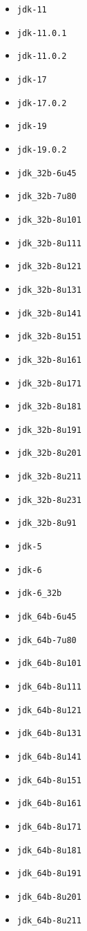 \begin{itemize}
\item \verb|jdk-11|
\item \verb|jdk-11.0.1|
\item \verb|jdk-11.0.2|
\item \verb|jdk-17|
\item \verb|jdk-17.0.2|
\item \verb|jdk-19|
\item \verb|jdk-19.0.2|
\item \verb|jdk_32b-6u45|
\item \verb|jdk_32b-7u80|
\item \verb|jdk_32b-8u101|
\item \verb|jdk_32b-8u111|
\item \verb|jdk_32b-8u121|
\item \verb|jdk_32b-8u131|
\item \verb|jdk_32b-8u141|
\item \verb|jdk_32b-8u151|
\item \verb|jdk_32b-8u161|
\item \verb|jdk_32b-8u171|
\item \verb|jdk_32b-8u181|
\item \verb|jdk_32b-8u191|
\item \verb|jdk_32b-8u201|
\item \verb|jdk_32b-8u211|
\item \verb|jdk_32b-8u231|
\item \verb|jdk_32b-8u91|
\item \verb|jdk-5|
\item \verb|jdk-6|
\item \verb|jdk-6_32b|
\item \verb|jdk_64b-6u45|
\item \verb|jdk_64b-7u80|
\item \verb|jdk_64b-8u101|
\item \verb|jdk_64b-8u111|
\item \verb|jdk_64b-8u121|
\item \verb|jdk_64b-8u131|
\item \verb|jdk_64b-8u141|
\item \verb|jdk_64b-8u151|
\item \verb|jdk_64b-8u161|
\item \verb|jdk_64b-8u171|
\item \verb|jdk_64b-8u181|
\item \verb|jdk_64b-8u191|
\item \verb|jdk_64b-8u201|
\item \verb|jdk_64b-8u211|

\end{itemize}
